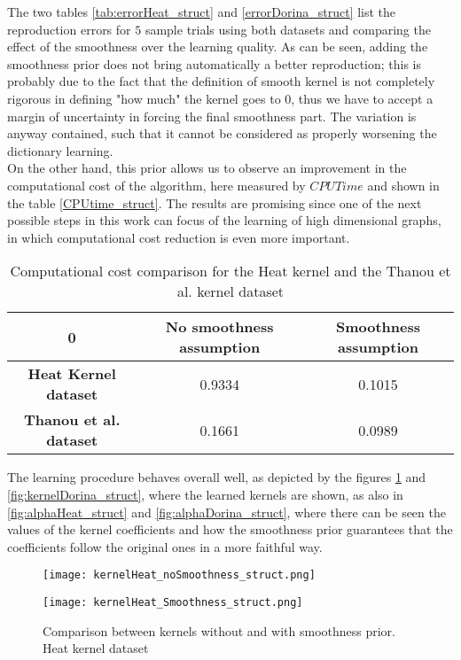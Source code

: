 The two tables \ref{tab:errorHeat_struct} and \ref{errorDorina_struct} list the reproduction errors for $5$ sample trials using both datasets and comparing the effect of the smoothness over the learning quality. As can be seen, adding the smoothness prior does not bring automatically a better reproduction; this is probably due to the fact that the definition of smooth kernel is not completely rigorous in defining "how much" the kernel goes to $0$, thus we have to accept a margin of uncertainty in forcing the final smoothness part. The variation is anyway contained, such that it cannot be considered as properly worsening the dictionary learning.\\

On the other hand, this prior allows us to observe an improvement in the computational cost of the algorithm, here measured by $CPUTime$ and shown in the table \ref{CPUtime_struct}. The results are promising since one of the next possible  steps in this work can focus of the learning of high dimensional graphs, in which computational cost reduction is even more important.

\begin{table}[htbp]
  \centering
  \begin{tabular}{c|c|c}
    0 &
    \multicolumn{1}{c}{\textbf{No smoothness assumption}} &
    \multicolumn{1}{|c}{\textbf{Smoothness assumption}}\\
    \hline
    \textbf{Heat Kernel dataset} & 0.9334 & 0.1015\\
    \textbf{Thanou et al. dataset} & 0.1661 & 0.0989 \\
  \end{tabular}
  \caption{Computational cost comparison for the Heat kernel and the Thanou et al. kernel dataset}
  \label{tab:CPUTime_struct}
\end{table}

The learning procedure behaves overall well, as depicted by the figures \ref{fig:kernelHeat_struct} and \ref{fig:kernelDorina_struct}, where the learned kernels are shown, as also in \autoref{fig:alphaHeat_struct} and \autoref{fig:alphaDorina_struct}, where there can be seen the values of the kernel coefficients and how the smoothness prior guarantees that the coefficients follow the original ones in a more faithful way.

\begin{figure}
  \begin{minipage}[c]{.5\textwidth}
    \centering
    \texttt{[image: kernelHeat\_noSmoothness\_struct.png]}
  \end{minipage}
  \begin{minipage}[c]{.5\textwidth}
    \centering
    \texttt{[image: kernelHeat\_Smoothness\_struct.png]}
  \end{minipage}
  \caption{Comparison between kernels without and with smoothness prior. Heat kernel dataset}
  \label{fig:kernelHeat_struct}
\end{figure}

